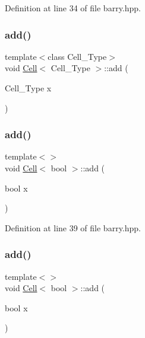Definition at line 34 of file barry.\+hpp.

\mbox{\label{class_cell_a3d063afd2a8743623d0e524debbd55e9}} 
\subsubsection{\texorpdfstring{add()}{add()}\hspace{0.1cm}{\footnotesize\ttfamily [7/9]}}
{\footnotesize\ttfamily template$<$class Cell\+\_\+\+Type$>$ \\
void \hyperlink{class_cell}{Cell}$<$ Cell\+\_\+\+Type $>$\+::add (\begin{DoxyParamCaption}\item[{Cell\+\_\+\+Type}]{x }\end{DoxyParamCaption})}

\mbox{\label{class_cell_a0da6d3d39069cc22486442cc51c7685c}} 
\subsubsection{\texorpdfstring{add()}{add()}\hspace{0.1cm}{\footnotesize\ttfamily [8/9]}}
{\footnotesize\ttfamily template$<$$>$ \\
void \hyperlink{class_cell}{Cell}$<$ bool $>$\+::add (\begin{DoxyParamCaption}\item[{bool}]{x }\end{DoxyParamCaption})\hspace{0.3cm}{\ttfamily [inline]}}



Definition at line 39 of file barry.\+hpp.

\mbox{\label{class_cell_a0da6d3d39069cc22486442cc51c7685c}} 
\subsubsection{\texorpdfstring{add()}{add()}\hspace{0.1cm}{\footnotesize\ttfamily [9/9]}}
{\footnotesize\ttfamily template$<$$>$ \\
void \hyperlink{class_cell}{Cell}$<$ bool $>$\+::add (\begin{DoxyParamCaption}\item[{bool}]{x }\end{DoxyParamCaption})\hspace{0.3cm}{\ttfamily [inline]}}



